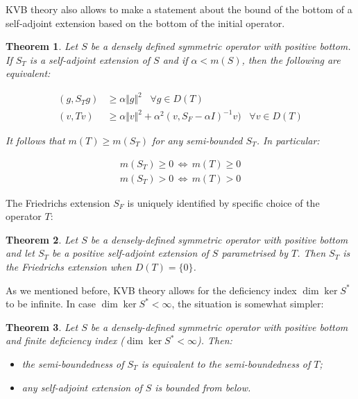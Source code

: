 \documentclass[11pt, a4paper, german]{article}
\theoremstyle{plain}
\newtheorem{theorem}{Theorem}
\theoremstyle{definition}
\theoremstyle{remark}
\numberwithin{equation}{section}
\numberwithin{theorem}{section}
\begin{document}
KVB theory also allows to make a statement about the bound of the bottom of a self-adjoint extension based on the bottom of the initial operator.

\begin{theorem}\label{kvb-est}
Let $S$ be a densely defined symmetric operator with positive bottom. If $S_T$ is a self-adjoint extension of $S$ and if $\alpha < m(S)$, then the following are equivalent:

\begin{align}
(g, S_T g) &\geq \alpha \Vert g \Vert ^2 \,\,\,\,\,\forall g \in D(T)\\
(v, Tv) &\geq \alpha \Vert v \Vert ^2 + \alpha ^2 (v, S_F-\alpha I ) ^{-1} v) \,\,\,\,\, \forall v \in D(T)
\end{align}

It follows that $m(T)\geq m(S_T)$ for any semi-bounded $S_T$. In particular:

\begin{align}
m(S_T)\geq 0 \,\Leftrightarrow\, m(T) \geq 0 \\
m(S_T)> 0 \,\Leftrightarrow\, m(T) > 0
\end{align}

\end{theorem}

The Friedrichs extension $S_F$ is uniquely identified by specific choice of the operator $T$:

\begin{theorem}
Let $S$ be a densely-defined symmetric operator with positive bottom and let $S_T$ be a positive self-adjoint extension of $S$ parametrised by $T$. Then $S_T$ is the Friedrichs extension when $D(T)=\{0\}$.
\end{theorem}

As we mentioned before, KVB theory allows for the deficiency index $\dim \ker S^*$ to be infinite. In case $\dim\ker S^* < \infty$, the situation is somewhat simpler:

\begin{theorem}
Let $S$ be a densely-defined symmetric operator with positive bottom and finite deficiency index ($\dim\ker S^*< \infty$). Then:
\begin{itemize}
\item the semi-boundedness of $S_T$ is equivalent to the semi-boundedness of $T$;
\item any self-adjoint extension of $S$ is bounded from below.
\end{itemize}
\end{theorem}
\end{document}
